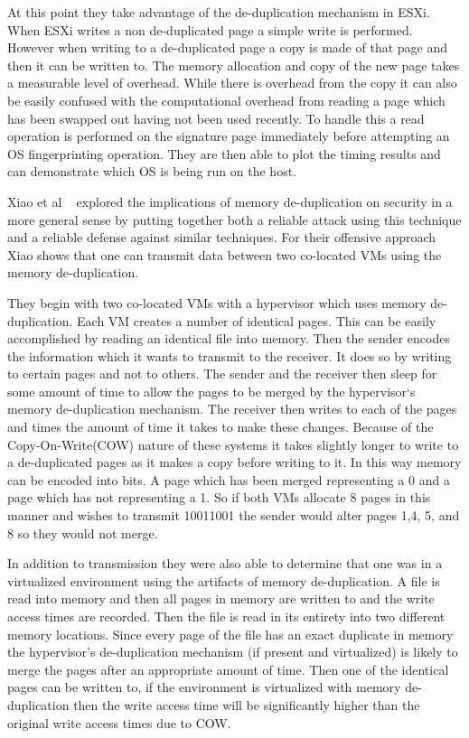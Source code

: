 At this point they take advantage of the de-duplication mechanism in ESXi. When ESXi writes a non de-duplicated page a simple write is performed. However when writing to a de-duplicated page a copy is made of that page and then it can be written to. The memory allocation and copy of the new page takes a measurable level of overhead. While there is overhead from the copy it can also be easily confused with the computational overhead from reading a page which has been swapped out having not been used recently. To handle this a read operation is performed on the signature page immediately before attempting an OS fingerprinting operation. They are then able to plot the timing results and can demonstrate which OS is being run on the host. 

Xiao et al ~\cite{xiao_security_2013} explored the implications of memory de-duplication on security in a more general sense by putting together both a reliable attack using this technique and a reliable defense against similar techniques. For their offensive approach Xiao shows that one can transmit data between two co-located VMs using the memory de-duplication. 

They begin with two co-located VMs with a hypervisor which uses memory de-duplication. Each VM creates a number of identical pages. This can be easily accomplished by reading an identical file into memory. Then the sender encodes the information which it wants to transmit to the receiver. It does so by writing to certain pages and not to others. The sender and the receiver then sleep for some amount of time to allow the pages to be merged by the hypervisor`s memory de-duplication mechanism. The receiver then writes to each of the pages and times the amount of time it takes to make these changes. Because of the Copy-On-Write(COW) nature of these systems it takes slightly longer to write to a de-duplicated pages as it makes a copy before writing to it. In this way memory can be encoded into bits. A page which has been merged representing a 0 and a page which has not representing a 1. So if both VMs allocate 8 pages in this manner and wishes to transmit 10011001 the sender would alter pages 1,4, 5, and 8 so they would not merge. 

In addition to transmission they were also able to determine that one was in a virtualized environment using the artifacts of memory de-duplication. A file is read into memory and then all pages in memory are written to and the write access times are recorded. Then the file is read in its entirety into two different memory locations. Since every page of the file has an exact duplicate in memory the hypervisor’s de-duplication mechanism (if present and virtualized) is likely to merge the pages after an appropriate amount of time. Then one of the identical pages can be written to, if the environment is virtualized with memory de-duplication then the write access time will be significantly higher than the original write access times due to COW. 



